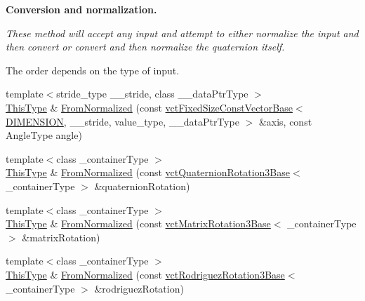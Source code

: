 \begin{Indent}{\bf Conversion and normalization.}\par
{\em These method will accept any input and attempt to either normalize the input and then convert or convert and then normalize the quaternion itself.\par
The order depends on the type of input. }\begin{DoxyCompactItemize}
\item 
{\footnotesize template$<$stride\-\_\-type \-\_\-\-\_\-stride, class \-\_\-\-\_\-data\-Ptr\-Type $>$ }\\\hyperlink{classvct_axis_angle_rotation3_af654a8037b7b82a378f69cb1bfd9b8dd}{This\-Type} \& \hyperlink{classvct_axis_angle_rotation3_a50c217d61a517bda838d9b1cbe2aaa5d}{From\-Normalized} (const \hyperlink{classvct_fixed_size_const_vector_base}{vct\-Fixed\-Size\-Const\-Vector\-Base}$<$ \hyperlink{classvct_axis_angle_rotation3_a278b4a98a62e4f5ff42ce055836240a9a778d22dfe29402d2cfdd381c1b870285}{D\-I\-M\-E\-N\-S\-I\-O\-N}, \-\_\-\-\_\-stride, value\-\_\-type, \-\_\-\-\_\-data\-Ptr\-Type $>$ \&axis, const Angle\-Type angle)
\item 
{\footnotesize template$<$class \-\_\-container\-Type $>$ }\\\hyperlink{classvct_axis_angle_rotation3_af654a8037b7b82a378f69cb1bfd9b8dd}{This\-Type} \& \hyperlink{classvct_axis_angle_rotation3_ad11bae97a565e6c5680a3030fc6ca015}{From\-Normalized} (const \hyperlink{classvct_quaternion_rotation3_base}{vct\-Quaternion\-Rotation3\-Base}$<$ \-\_\-container\-Type $>$ \&quaternion\-Rotation)
\item 
{\footnotesize template$<$class \-\_\-container\-Type $>$ }\\\hyperlink{classvct_axis_angle_rotation3_af654a8037b7b82a378f69cb1bfd9b8dd}{This\-Type} \& \hyperlink{classvct_axis_angle_rotation3_a1b960664eabdb59b342fd81e5c9d1564}{From\-Normalized} (const \hyperlink{classvct_matrix_rotation3_base}{vct\-Matrix\-Rotation3\-Base}$<$ \-\_\-container\-Type $>$ \&matrix\-Rotation)
\item 
{\footnotesize template$<$class \-\_\-container\-Type $>$ }\\\hyperlink{classvct_axis_angle_rotation3_af654a8037b7b82a378f69cb1bfd9b8dd}{This\-Type} \& \hyperlink{classvct_axis_angle_rotation3_a7233e3bbd1724b7d69ea4fcdc7ddc3e5}{From\-Normalized} (const \hyperlink{classvct_rodriguez_rotation3_base}{vct\-Rodriguez\-Rotation3\-Base}$<$ \-\_\-container\-Type $>$ \&rodriguez\-Rotation)
\end{DoxyCompactItemize}
\end{Indent}
